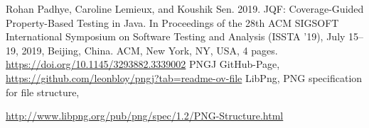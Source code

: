 \documentclass[runningheads]{llncs}
\begin{document}
%
%
%
% 
% 
%
\begin{thebibliography}{8}
Rohan Padhye, Caroline Lemieux, and Koushik Sen. 2019. JQF: Coverage-Guided Property-Based Testing in Java. In Proceedings of the 28th ACM SIGSOFT International Symposium on Software Testing and Analysis (ISSTA ’19), July 15–19, 2019, Beijing, China. ACM, New York, NY, USA, 4 pages. \url{https://doi.org/10.1145/3293882.3339002}
PNGJ GitHub-Page, \url{https://github.com/leonbloy/pngj?tab=readme-ov-file}
LibPng, PNG specification for file structure,

\url{http://www.libpng.org/pub/png/spec/1.2/PNG-Structure.html}
\end{thebibliography}
\end{document}
